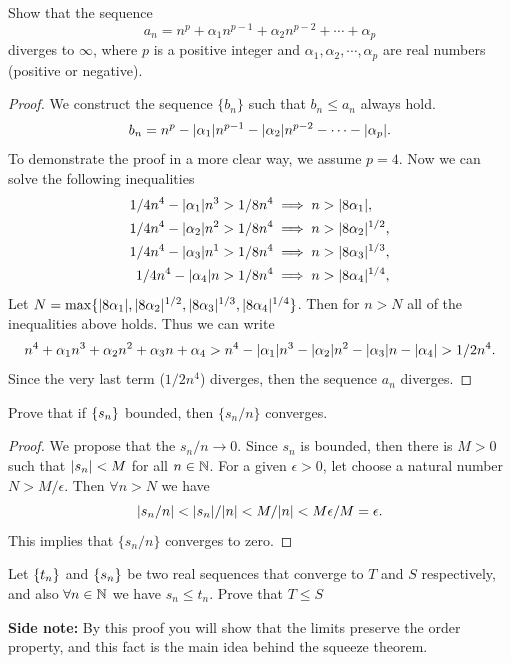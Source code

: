 \begin{problem}
	Show that the sequence 
	\[ a_n = n^p + \alpha_1 n^{p-1} + \alpha_2 n^{p-2} + \cdots + \alpha_p  \]
	diverges to $\infty$, where $p$ is a positive integer and $\alpha_1, \alpha_2, \cdots, \alpha_p$ are real numbers (positive or negative). 
\end{problem}

\begin{proof}
	We construct the sequence $\{b_n\}$ such that $b_n \leq a_n$ always hold.
	\[ b_n = n^p - |\alpha_1|n^{p-1} -|\alpha_2|n^{p-2}  - \cdots - |\alpha_p|. \]
	To demonstrate the proof in a more clear way, we assume $p=4$. Now we can solve the following inequalities
	\begin{align*}
		1/4 n^4 - |\alpha_1|n^3 > 1/8 n^4 &\implies n > |8\alpha_1|,\\
		1/4 n^4 - |\alpha_2|n^2 > 1/8 n^4 &\implies n > |8\alpha_2|^{1/2},\\
		1/4 n^4 - |\alpha_3|n^1 > 1/8 n^4 &\implies n > |8\alpha_3|^{1/3},\\
		1/4 n^4 - |\alpha_4|n > 1/8 n^4 &\implies n > |8\alpha_4|^{1/4},\\
	\end{align*}
	Let $N = \max\{ |8\alpha_1|, |8\alpha_2|^{1/2},|8\alpha_3|^{1/3},|8\alpha_4|^{1/4}\}$. Then for $n > N$ all of the inequalities above holds. Thus we can write
	\[  n^4 + \alpha_1 n^3 + \alpha_2 n^2 + \alpha_3 n + \alpha_4 > n^4 - |\alpha_1|n^3 - |\alpha_2|n^2 - |\alpha_3| n - |\alpha_4| > 1/2 n^4. \]
	Since the very last term ($1/2n^4$) diverges, then the sequence $a_n$ diverges.
\end{proof}


\begin{problem}
	Prove that if $\{s_n\}$ bounded, then $\{s_n/n\}$ converges.
\end{problem}
\begin{proof}
	We propose that the $s_n/n \to 0$. Since $s_n$ is bounded, then there is $M>0$ such that $|s_n|<M$ for all $n \in \mathbb{N}$. For a given $\epsilon>0$, let choose a natural number $N>M/\epsilon$. Then $\forall n>N$ we have
	\[ |s_n/n| < |s_n|/|n| < M/|n| < M\epsilon/M = \epsilon. \]
	This implies that $\{s_n/n\}$ converges to zero.
\end{proof}

\begin{problem}
	Let $\{t_n\}$ and $\{s_n\}$ be two real sequences that converge to $T$ and $S$ respectively, and also $\forall n \in \mathbb{N}$ we have $s_n \leq t_n$. Prove that $T \leq S$
	
	\textbf{Side note:} By this proof you will show that the limits preserve the order property, and this fact is the main idea behind the squeeze theorem.
\end{problem} 

